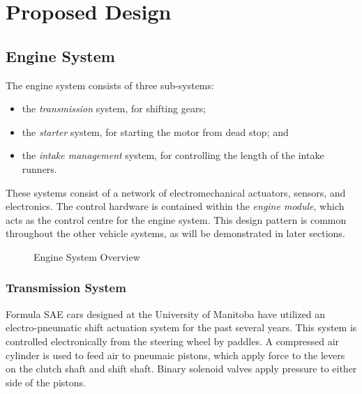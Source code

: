 %
%
%
%

\chapter{Proposed Design}

%
%

\section{Engine System}

The engine system consists of three sub-systems:

\begin{itemize}

\item the \emph{transmission} system, for shifting gears;

\item the \emph{starter} system, for starting the motor from dead stop; and

\item the \emph{intake management} system, for controlling the length of the intake runners.

\end{itemize}

These systems consist of a network of electromechanical actuators, sensors, and electronics. The control hardware is contained within the \emph{engine module}, which acts as the control centre for the engine system. This design pattern is common throughout the other vehicle systems, as will be demonstrated in later sections.

\begin{figure}[H]
	\centering
		
	\caption{Engine System Overview\label{fig:engine_system_overview}}
\end{figure}

\subsection{Transmission System}

Formula SAE cars designed at the University of Manitoba have utilized an electro-pneumatic shift actuation system for the past several years. This system is controlled electronically from the steering wheel by paddles. A compressed air cylinder is used to feed air to pneumaic pistons, which apply force to the levers on the clutch shaft and shift shaft. Binary solenoid valves apply pressure to either side of the pistons. 

